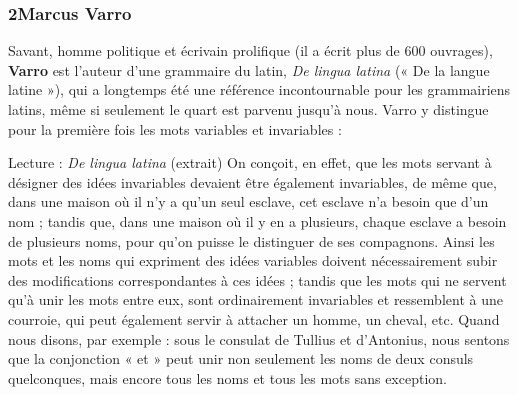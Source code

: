 \subsubsection*{2\quad Marcus Varro}
Savant, homme politique et écrivain prolifique (il a écrit plus de 600 ouvrages), \textbf{Varro} est l’auteur d’une grammaire du latin, \textit{De lingua latina} (« De la langue latine »), qui a longtemps été une référence incontournable pour les grammairiens latins, même si seulement le quart est parvenu jusqu’à nous. Varro y distingue pour la première fois les mots variables et invariables :
\begin{lecture}{Lecture : \textit{De lingua latina} (extrait)}
On conçoit, en effet, que les mots servant à désigner des idées invariables devaient être également invariables, de même que, dans une maison où il n’y a qu’un seul esclave, cet esclave n’a besoin que d’un nom ; tandis que, dans une maison où il y en a plusieurs, chaque esclave a besoin de plusieurs noms, pour qu’on puisse le distinguer de ses compagnons. Ainsi les mots et les noms qui expriment des idées variables doivent nécessairement subir des modifications correspondantes à ces idées ; tandis que les mots qui ne servent qu’à unir les mots entre eux, sont ordinairement invariables et ressemblent à une courroie, qui peut également servir à attacher un homme, un cheval, etc. Quand nous disons, par exemple : sous le consulat de Tullius et d’Antonius, nous sentons que la conjonction « et » peut unir non seulement les noms de deux consuls quelconques, mais encore tous les noms et tous les mots sans exception.
\end{lecture}
